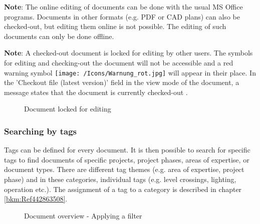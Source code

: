 
\textbf{Note}: The online editing of documents can be done with the usual MS Office programs. Documents in other formats (e.g. PDF or CAD plans) can also be checked-out, but editing them online is not possible. The editing of such documents can only be done offline. \newline


\textbf{Note}: A checked-out document is locked for editing by other users. The symbols for editing and checking-out the document will not be accessible and a red warning symbol \texttt{[image: /Icons/Warnung\_rot.jpg]}  will appear in their place. In the 'Checkout file (latest version)' field in the view mode of the document, a message states that the document is currently checked-out .

\begin{figure}[H]
\caption{Document locked for editing}
\end{figure}

\subsubsection{Searching by tags}
\label{bkm:Ref442275849}

Tags can be defined for every document. It is then possible to search for specific tags to find documents of specific projects, project phases, areas of expertise, or document types. There are different tag themes (e.g. area of expertise, project phase) and in these categories, individual tags (e.g. level crossings, lighting, operation etc.). The assignment of a tag to a category is described in chapter \ref{bkm:Ref442863508}.

\begin{figure}[H]
\caption{Document overview - Applying a filter}
\end{figure}

